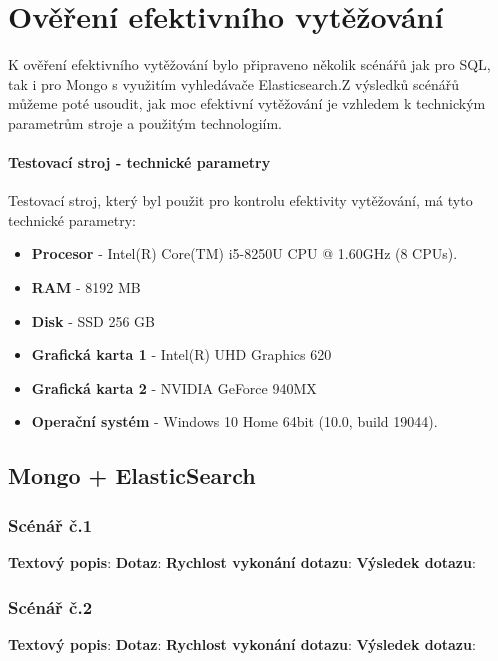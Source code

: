 \lstset{style=sqlstyle}

\chapter{Ověření efektivního vytěžování}
K ověření efektivního vytěžování bylo připraveno několik scénářů jak pro SQL, tak i pro Mongo s využitím vyhledávače Elasticsearch.Z výsledků scénářů můžeme poté usoudit, jak moc efektivní vytěžování je vzhledem k technickým parametrům stroje a použitým technologiím.

\subsubsection{Testovací stroj - technické parametry}
Testovací stroj, který byl použit pro kontrolu efektivity vytěžování, má tyto technické parametry:
\begin{itemize}
\item \textbf{Procesor} - Intel(R) Core(TM) i5-8250U CPU @ 1.60GHz (8 CPUs).
\item \textbf{RAM} - 8192 MB
\item \textbf{Disk} - SSD 256 GB
\item \textbf{Grafická karta 1} - Intel(R) UHD Graphics 620
\item \textbf{Grafická karta 2} - NVIDIA GeForce 940MX
\item \textbf{Operační systém} - Windows 10 Home 64bit (10.0, build 19044).

\end{itemize}

\section{Mongo + ElasticSearch}

\subsection{Scénář č.1}
\textbf{Textový popis}: 
\newline
\textbf{Dotaz}: 
\newline
\textbf{Rychlost vykonání dotazu}:
\newline
\textbf{Výsledek dotazu}:

\subsection{Scénář č.2}
\textbf{Textový popis}: 
\newline
\textbf{Dotaz}: 
\newline
\textbf{Rychlost vykonání dotazu}:
\newline
\textbf{Výsledek dotazu}:

